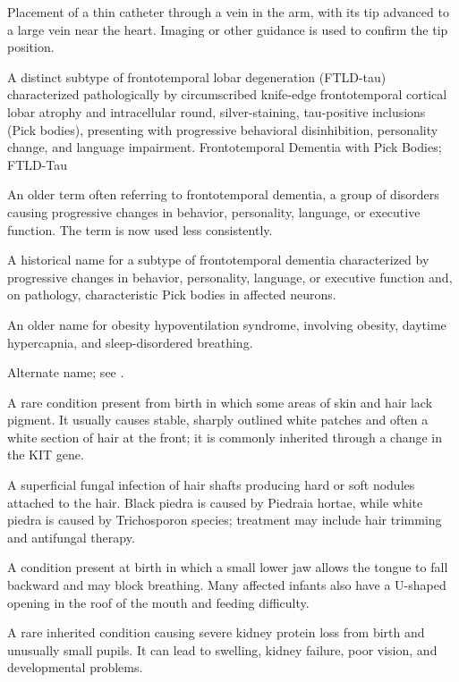  Placement of a thin catheter through a vein in the arm, with its tip advanced to a large vein near the heart. Imaging or other guidance is used to confirm the tip position.


 A distinct subtype of frontotemporal lobar degeneration (FTLD-tau) characterized pathologically by circumscribed knife-edge frontotemporal cortical lobar atrophy and intracellular round, silver-staining, tau-positive inclusions (Pick bodies), presenting with progressive behavioral disinhibition, personality change, and language impairment.
\synonyms
Frontotemporal Dementia with Pick Bodies; FTLD-Tau

 An older term often referring to frontotemporal dementia, a group of disorders causing progressive changes in behavior, personality, language, or executive function. The term is now used less consistently.

 A historical name for a subtype of frontotemporal dementia characterized by progressive changes in behavior, personality, language, or executive function and, on pathology, characteristic Pick bodies in affected neurons.

 An older name for obesity hypoventilation syndrome, involving obesity, daytime hypercapnia, and sleep-disordered breathing.

 Alternate name; see .

 A rare condition present from birth in which some areas of skin and hair lack pigment. It usually causes stable, sharply outlined white patches and often a white section of hair at the front; it is commonly inherited through a change in the KIT gene.

 A superficial fungal infection of hair shafts producing hard or soft nodules attached to the hair. Black piedra is caused by Piedraia hortae, while white piedra is caused by Trichosporon species; treatment may include hair trimming and antifungal therapy.

 A condition present at birth in which a small lower jaw allows the tongue to fall backward and may block breathing. Many affected infants also have a U-shaped opening in the roof of the mouth and feeding difficulty.

 A rare inherited condition causing severe kidney protein loss from birth and unusually small pupils. It can lead to swelling, kidney failure, poor vision, and developmental problems.

